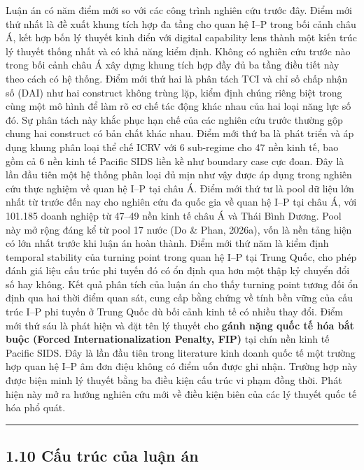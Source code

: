 \documentclass[12pt,a4paper]{article}
\begin{document}
Luận án có năm điểm mới so với các công trình nghiên cứu trước đây. Điểm
mới thứ nhất là đề xuất khung tích hợp đa tầng cho quan hệ I--P trong
bối cảnh châu Á, kết hợp bốn lý thuyết kinh điển với digital capability
lens thành một kiến trúc lý thuyết thống nhất và có khả năng kiểm định.
Không có nghiên cứu trước nào trong bối cảnh châu Á xây dựng khung tích
hợp đầy đủ ba tầng điều tiết này theo cách có hệ thống. Điểm mới thứ hai
là phân tách TCI và chỉ số chấp nhận số (DAI) như hai construct không
trùng lặp, kiểm định chúng riêng biệt trong cùng một mô hình để làm rõ
cơ chế tác động khác nhau của hai loại năng lực số đó. Sự phân tách này
khắc phục hạn chế của các nghiên cứu trước thường gộp chung hai
construct có bản chất khác nhau. Điểm mới thứ ba là phát triển và áp
dụng khung phân loại thể chế ICRV với 6 sub-regime cho 47 nền kinh tế,
bao gồm cả 6 nền kinh tế Pacific SIDS liền kề như boundary case cực
đoan. Đây là lần đầu tiên một hệ thống phân loại đủ mịn như vậy được áp
dụng trong nghiên cứu thực nghiệm về quan hệ I--P tại châu Á. Điểm mới
thứ tư là pool dữ liệu lớn nhất từ trước đến nay cho nghiên cứu đa quốc
gia về quan hệ I--P tại châu Á, với 101.185 doanh nghiệp từ 47--49 nền
kinh tế châu Á và Thái Bình Dương. Pool này mở rộng đáng kể từ pool 17
nước (Do \& Phan, 2026a), vốn là nền tảng hiện có lớn nhất trước khi
luận án hoàn thành. Điểm mới thứ năm là kiểm định temporal stability của
turning point trong quan hệ I--P tại Trung Quốc, cho phép đánh giá liệu
cấu trúc phi tuyến đó có ổn định qua hơn một thập kỷ chuyển đổi số hay
không. Kết quả phân tích của luận án cho thấy turning point tương đối ổn
định qua hai thời điểm quan sát, cung cấp bằng chứng về tính bền vững
của cấu trúc I--P phi tuyến ở Trung Quốc dù bối cảnh kinh tế có nhiều
thay đổi. Điểm mới thứ sáu là phát hiện và đặt tên lý thuyết cho
\textbf{gánh nặng quốc tế hóa bắt buộc (Forced Internationalization
Penalty, FIP)} tại chín nền kinh tế Pacific SIDS. Đây là lần đầu tiên
trong literature kinh doanh quốc tế một trường hợp quan hệ I--P âm đơn
điệu không có điểm uốn được ghi nhận. Trường hợp này được biện minh lý
thuyết bằng ba điều kiện cấu trúc vi phạm đồng thời. Phát hiện này mở ra
hướng nghiên cứu mới về điều kiện biên của các lý thuyết quốc tế hóa phổ
quát.

\begin{center}\rule{0.5\linewidth}{0.5pt}\end{center}

\hypertarget{110-cux1ea5u-truxfac-cux1ee7a-luux1eadn-uxe1n}{%
\subsection{1.10 Cấu trúc của luận
án}\label{110-cux1ea5u-truxfac-cux1ee7a-luux1eadn-uxe1n}}
\end{document}
